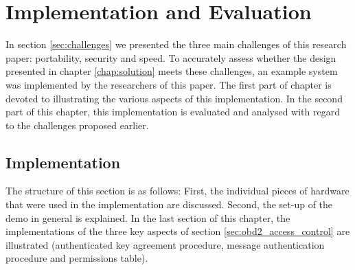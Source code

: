 
\chapter{Implementation and Evaluation}
\label{chap:implementation}

In section \ref{sec:challenges} we presented the three main challenges of this research paper: portability, security and speed. To accurately assess whether the design presented in chapter \ref{chap:solution} meets these challenges, an example system was implemented by the researchers of this paper. The first part of chapter is devoted to illustrating the various aspects of this implementation. In the second part of this chapter, this implementation is evaluated and analysed with regard to the challenges proposed earlier. 

\section{Implementation}
The structure of this section is as follows: First, the individual pieces of hardware that were used in the implementation are discussed. Second, the set-up of the demo in general is explained. In the last section of this chapter, the implementations of the three key aspects of section \ref{sec:obd2_access_control} are illustrated (authenticated key agreement procedure, message authentication procedure and permissions table).


